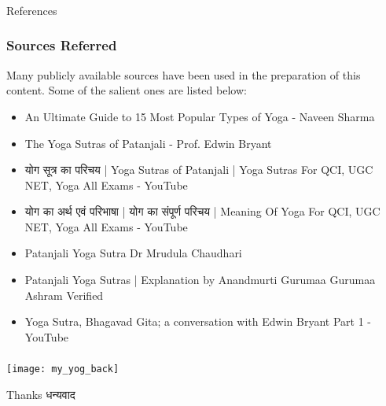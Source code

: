 \begin{frame}[fragile]\frametitle{}
\begin{center}
{\Large References}
\end{center}
\end{frame}


\begin{frame}[fragile]\frametitle{Sources Referred}

Many publicly available sources have been used in the preparation of this content. Some of the salient ones are listed below:

	\begin{itemize}
	\item An Ultimate Guide to 15 Most Popular Types of Yoga - Naveen Sharma
	\item The Yoga Sutras of Patanjali - Prof. Edwin Bryant
	\item योग सूत्र का परिचय | Yoga Sutras of Patanjali | Yoga Sutras For QCI, UGC NET, Yoga All Exams - YouTube
	\item योग का अर्थ एवं परिभाषा | योग का संपूर्ण परिचय | Meaning Of Yoga For QCI, UGC NET, Yoga All Exams - YouTube
	\item Patanjali Yoga Sutra Dr Mrudula Chaudhari
	\item Patanjali Yoga Sutras | Explanation by Anandmurti Gurumaa Gurumaa Ashram Verified
	\item Yoga Sutra, Bhagavad Gita; a conversation with Edwin Bryant Part 1 - YouTube
	\end{itemize}

\end{frame}


\begin{frame}[fragile]\frametitle{}

\begin{center}
\texttt{[image: my\_yog\_back]}

Thanks धन्यवाद
\end{center}

\end{frame}